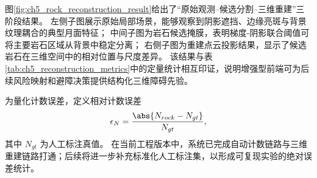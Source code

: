 图\ref{fig:ch5_rock_reconstruction_result}给出了“原始观测--候选分割--三维重建”三阶段结果。
左侧子图展示原始局部场景，能够观察到阴影遮挡、边缘亮斑与背景纹理耦合的典型月面特征；
中间子图为岩石候选掩膜，表明梯度-阴影联合阈值可将主要岩石区域从背景中稳定分离；
右侧子图为重建点云投影结果，显示了候选岩石在三维空间中的相对位置与尺度差异。
该结果与表\ref{tab:ch5_reconstruction_metrics}中的定量统计相互印证，说明增强型前端可为后续风险映射和避障决策提供结构化三维障碍先验。

为量化计数误差，定义相对计数误差
\begin{equation}
\epsilon_N=\frac{\abs{N_{rock}-N_{gt}}}{N_{gt}},
\label{eq:ch5_count_error}
\end{equation}
其中 $N_{gt}$ 为人工标注真值。
在当前工程版本中，系统已完成自动计数链路与三维重建链路打通；后续将进一步补充标准化人工标注集，以形成可复现实验的绝对误差统计。
